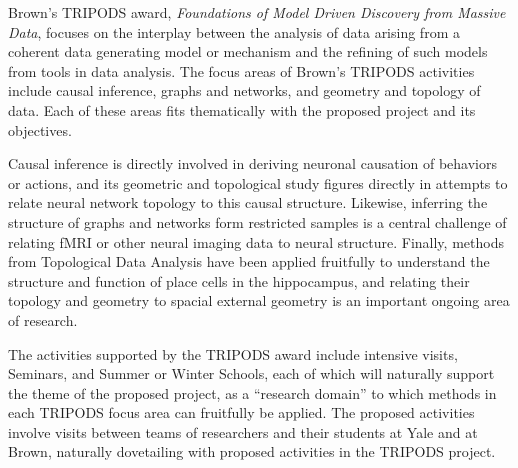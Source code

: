 
Brown's TRIPODS award, \emph{Foundations of Model Driven Discovery from Massive Data}, focuses on the interplay between the analysis of data arising from a coherent data generating model or mechanism and the refining of such models from tools in data analysis. The focus areas of Brown's TRIPODS activities include causal inference, graphs and networks, and geometry and topology of data. Each of these areas fits thematically with the proposed project and its objectives.

Causal inference is directly involved in deriving neuronal causation of behaviors or actions, and its geometric and topological study figures directly in attempts to relate neural network topology to this causal structure.
Likewise, inferring the structure of graphs and networks form restricted samples is a central challenge of relating fMRI or other neural imaging data to neural structure. 
Finally, methods from Topological Data Analysis have been applied fruitfully to understand the structure and function of place cells in the hippocampus, and relating their topology and geometry to spacial external geometry is an important ongoing area of research.

The activities supported by the TRIPODS award include intensive visits, Seminars, and Summer or Winter Schools, each of which will naturally support the theme of the proposed project, as a ``research domain'' to which methods in each TRIPODS focus area can fruitfully be applied. The proposed activities involve visits between teams of researchers and their students at Yale and at Brown, naturally dovetailing with proposed activities in the TRIPODS project. 